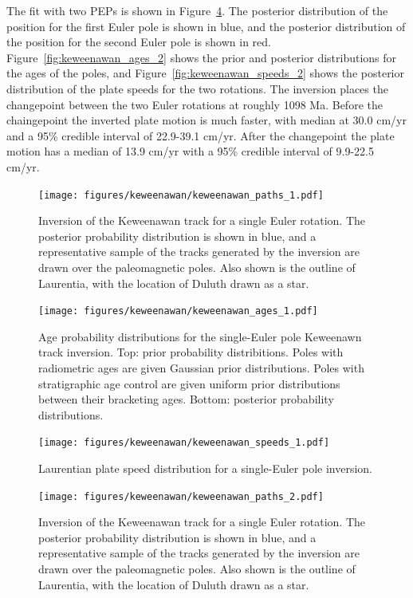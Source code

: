 \documentclass[preprint,12pt,authoryear]{elsarticle}
\begin{document}
The fit with two PEPs is shown in Figure~\ref{fig:keweenawan_paths_2}.
The posterior distribution of the position for the first Euler pole is shown in blue,
and the posterior distribution of the position for the second Euler pole is shown in red.
Figure~\ref{fig:keweenawan_ages_2} shows the prior and posterior distributions for the ages of the poles,
and Figure~\ref{fig:keweenawan_speeds_2} shows the posterior distribution of the plate speeds for the two rotations.
The inversion places the changepoint between the two Euler rotations at roughly 1098 Ma.
Before the chaingepoint the inverted plate motion is much faster, with median at 30.0 cm/yr
and a 95\% credible interval of 22.9-39.1 cm/yr. After the changepoint the plate motion has a median
of 13.9 cm/yr with a 95\% credible interval of 9.9-22.5 cm/yr.


\begin{figure}
\texttt{[image: figures/keweenawan/keweenawan\_paths\_1.pdf]}
\caption[Inversion of the Keweenawan track for a single Euler rotation]{Inversion of the Keweenawan track for a single Euler rotation. The posterior probability distribution is shown in blue, and a representative sample of the tracks generated by the inversion are drawn over the paleomagnetic poles. Also shown is the outline of Laurentia, with the location of Duluth drawn as a star.}
\label{fig:keweenawan_paths_1}
\end{figure}
\begin{figure}
\texttt{[image: figures/keweenawan/keweenawan\_ages\_1.pdf]}
\caption[Age probability distributions for the single-Euler pole Keweenawan track inversion]{Age probability distributions for the single-Euler pole Keweenawn track inversion. Top: prior probability distribitions. Poles with radiometric ages are given Gaussian prior distributions. Poles with stratigraphic age control are given uniform prior distributions between their bracketing ages. Bottom: posterior probability distributions.}
\label{fig:keweenawan_ages_1}
\end{figure}
\begin{figure}
\texttt{[image: figures/keweenawan/keweenawan\_speeds\_1.pdf]}
\caption[Laurentian plate speed distribution for a single-Euler pole inversion]{Laurentian plate speed distribution for a single-Euler pole inversion.}
\label{fig:keweenawan_speeds_1}
\end{figure}
\begin{figure}
\texttt{[image: figures/keweenawan/keweenawan\_paths\_2.pdf]}
\caption[Inversion of the Keweenawan track for two Euler rotations]{Inversion of the Keweenawan track for a single Euler rotation. The posterior probability distribution is shown in blue, and a representative sample of the tracks generated by the inversion are drawn over the paleomagnetic poles. Also shown is the outline of Laurentia, with the location of Duluth drawn as a star.}
\label{fig:keweenawan_paths_2}
\end{figure}
\end{document}
